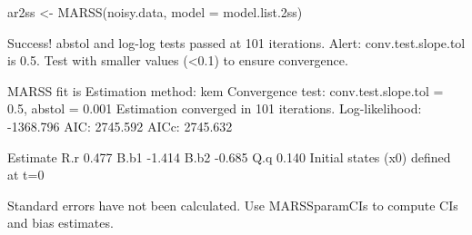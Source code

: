 \begin{Schunk}
\begin{Sinput}
 ar2ss <- MARSS(noisy.data, model = model.list.2ss)
\end{Sinput}
\begin{Soutput}
Success! abstol and log-log tests passed at 101 iterations.
Alert: conv.test.slope.tol is 0.5.
Test with smaller values (<0.1) to ensure convergence.

MARSS fit is
Estimation method: kem 
Convergence test: conv.test.slope.tol = 0.5, abstol = 0.001
Estimation converged in 101 iterations. 
Log-likelihood: -1368.796 
AIC: 2745.592   AICc: 2745.632   
 
     Estimate
R.r     0.477
B.b1   -1.414
B.b2   -0.685
Q.q     0.140
Initial states (x0) defined at t=0

Standard errors have not been calculated. 
Use MARSSparamCIs to compute CIs and bias estimates.
\end{Soutput}
\end{Schunk}
